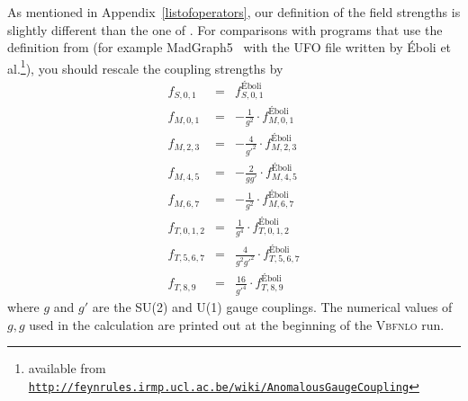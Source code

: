 \documentclass[english,12pt]{article}
\begin{document}
As mentioned in Appendix~\ref{listofoperators}, our definition of the field strengths is
slightly different than the one of \cite{Eboli:2006wa}. For comparisons with
programs that use the definition from \cite{Eboli:2006wa} (for example MadGraph5~\cite{Alwall:2011uj} with
the UFO file written by \'Eboli et 
al.\footnote{available from \tt \href{http://feynrules.irmp.ucl.ac.be/wiki/AnomalousGaugeCoupling}{http://feynrules.irmp.ucl.ac.be/wiki/AnomalousGaugeCoupling}}), 
you should rescale the coupling strengths by
\begin{eqnarray}
 f_{S,0,1}   &=&                            f_{S,0,1}^\textrm{\'Eboli}  \\
 f_{M,0,1}   &=& - \frac{1}{g^2}      \cdot f_{M,0,1}^\textrm{\'Eboli}  \\
 f_{M,2,3}   &=& - \frac{4}{g'^2}     \cdot f_{M,2,3}^\textrm{\'Eboli}  \\
 f_{M,4,5}   &=& - \frac{2}{g g'}     \cdot f_{M,4,5}^\textrm{\'Eboli}  \\
 f_{M,6,7}   &=& - \frac{1}{g^2}      \cdot f_{M,6,7}^\textrm{\'Eboli}  \\
 f_{T,0,1,2} &=&   \frac{1}{g^4}      \cdot f_{T,0,1,2}^\textrm{\'Eboli}\\
 f_{T,5,6,7} &=&   \frac{4}{g^2 g'^2} \cdot f_{T,5,6,7}^\textrm{\'Eboli}\\
 f_{T,8,9}   &=&   \frac{16}{g'^4}    \cdot f_{T,8,9}^\textrm{\'Eboli}
\end{eqnarray}
where $g$ and $g'$ are the SU(2) and U(1) gauge couplings.
The numerical values of $g, g$ used in the calculation are printed out at
the beginning of the \textsc{Vbfnlo} run.


\newpage
\end{document}
